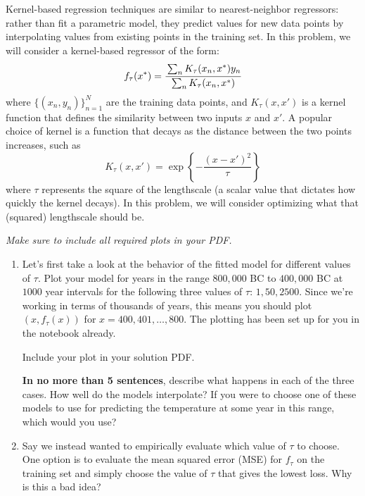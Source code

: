 \documentclass[submit]{harvardml}
\begin{document}
\begin{problem}
Kernel-based regression techniques are similar to nearest-neighbor
regressors: rather than fit a parametric model, they predict values
for new data points by interpolating values from existing points in
the training set.  In this problem, we will consider a kernel-based
regressor of the form:
\begin{equation*}
  f_\tau(x^*) = \cfrac{\sum_{n} K_\tau(x_n,x^*) y_n}{\sum_n K_\tau(x_n, x^*)} 
\end{equation*}
where $\{(x_n,y_n)\}_{n = 1} ^N$ are the training data points, and $K_\tau(x,x')$ is a
kernel function that defines the similarity between two inputs $x$ and
$x'$. A popular choice of kernel is a function that decays as the
distance between the two points increases, such as
\begin{equation*}
  K_\tau(x,x') = \exp\left\{-\frac{(x-x')^2}{\tau}\right\}
\end{equation*}
where $\tau$ represents the square of the lengthscale (a scalar value that 
dictates how quickly the kernel decays).  In this
problem, we will consider optimizing what that (squared) lengthscale
should be.

\noindent\emph{Make sure to include all required plots in your PDF.}

\begin{enumerate}
  
\item Let's first take a look at the behavior of the fitted model for different values of $\tau$. Plot your model for years in the range $800,000$ BC to $400,000$ BC at $1000$ year intervals for the following three values of $\tau$: $1, 50, 2500$. Since we're working in terms of thousands of years, this means you should plot $(x, f_\tau(x))$ for $x = 400, 401, \dots, 800$. The plotting has been set up for you in the notebook already.


Include your plot in your solution PDF.

\textbf{In no more than 5 sentences}, describe what happens in each of the three cases. How well do the models interpolate? If you were to choose one of these models to use for predicting the temperature at some year in this range, which would you use? 

\item Say we instead wanted to empirically evaluate which value of $\tau$ to choose. One option is to evaluate the mean squared error (MSE) for $f_{\tau}$ on the training set and simply choose the value of $\tau$ that gives the lowest loss. Why is this a bad idea?
    

\end{enumerate}
\end{problem}
\end{document}
